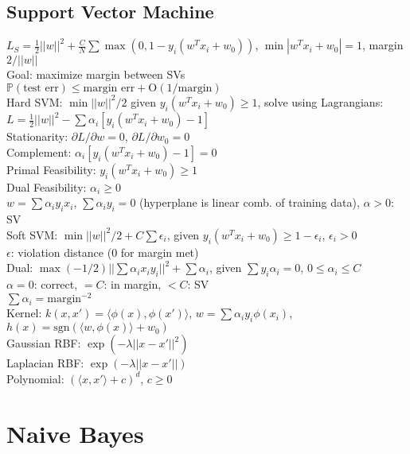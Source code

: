 \subsection*{Support Vector Machine}

$L_S = \frac{1}{2}||w||^2 + \frac{C}{N} \sum \max(0, 1-y_i(w^T x_i + w_0))$, $\min |w^T x_i + w_0| = 1$, margin $2/||w||$\\
Goal: maximize margin between SVs\\
$\mathbb{P}(\text{test err}) \leq \text{margin err} + \text{O}(1/\text{margin})$\\
Hard SVM: $\min ||w||^2/2$ given $y_i(w^T x_i + w_0) \geq 1$, solve using Lagrangians:\\
$L = \frac{1}{2} ||w||^2 - \sum \alpha_i [y_i(w^T x_i + w_0) - 1]$\\
Stationarity: ${\partial L}/{\partial w}=0$, ${\partial L}/{\partial w_0} = 0$\\
Complement: $\alpha_i [y_i (w^T x_i + w_0) - 1] = 0$\\
Primal Feasibility: $y_i (w^T x_i + w_0) \geq 1$\\
Dual Feasibility: $\alpha_i \geq 0$\\
$w = \sum \alpha_i y_i x_i$, $\sum \alpha_i y_i = 0$ (hyperplane is linear comb. of training data), $\alpha > 0$: SV\\
Soft SVM: $\min ||w||^2/2 + C \sum \epsilon_i$, given $y_i(w^T x_i + w_0) \geq 1 - \epsilon_i$, $\epsilon_i > 0$\\
$\epsilon$: violation distance (0 for margin met)\\
Dual: $\max (-1/2) ||\sum \alpha_i x_i y_i||^2 + \sum \alpha_i$, given $\sum y_i \alpha_i = 0$, $0 \leq \alpha_i \leq C$\\
$\alpha=0$: correct, $=C$: in margin, $< C$: SV\\
$\sum \alpha_i = \text{margin}^{-2}$\\
Kernel: $k(x, x') = \langle \phi(x), \phi(x') \rangle$, $w = \sum\alpha_i y_i \phi(x_i)$, $h(x) = \text{sgn}(\langle w, \phi(x) \rangle + w_0)$\\
Gaussian RBF: $\exp(-\lambda ||x - x'||^2)$\\
Laplacian RBF: $\exp(-\lambda ||x - x'||)$\\
Polynomial: $(\langle x, x' \rangle + c)^d$, $c \geq 0$

\section{Naive Bayes}

